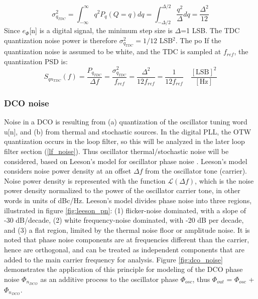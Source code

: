 	\begin{equation}\label{eq:tdc_noise}
		\sigma_{q_{TDC}}^2 = \int_{-\infty}^\infty q^2P_q(Q=q)dq =  \int_{-\Delta/2}^{\Delta/2}\frac{q^2}{\Delta}dq = \frac{\Delta^2}{12}
	\end{equation}
	Since $e_\Phi$[n] is a digital signal, the minimum step size is $\Delta$=1 LSB. The TDC quantization noise power is therefore $\sigma_{q_{TDC}}^2 = 1/12$ LSB$^2$. The po
	If the quantization noise is assumed to be white, and the TDC is sampled at $f_{ref}$, the quantization PSD is:
	\begin{equation}
		S_{qn_{TDC}}(f) = \frac{P_{q_{TDC}}}{\Delta f} = \frac{\sigma_{q_{TDC}}^2}{f_{ref}} = \frac{\Delta^2}{12f_{ref}} = \frac{1}{12f_{ref}} \hspace{1em}\frac{[\text{LSB}]^2}{[\text{Hz}]}
	\end{equation}

\subsubsection{DCO noise}\label{dco_noise}
	Noise in a DCO is resulting from (a) quantization of the oscillator tuning word u[n], and (b) from thermal and stochastic sources. In the digital PLL, the OTW quantization occurs in the loop filter, so this will be analyzed in the later loop filter section (\ref{lf_noise}). Thus oscillator thermal/stochastic noise will be considered, based on Leeson's model for oscillator phase noise \cite{leeson_1966}. Leeson's model considers noise power density at an offset $\Delta f$ from the oscillator tone (carrier). Noise power density is represented with the function $\mathcal{L}(\Delta f)$, which is the noise power density normalized to the power of the oscillator carrier tone, in other words in units of dBc/Hz. Leeson's model divides phase noise into three regions, illustrated in figure \ref{fig:leeson_pn}: (1) flicker-noise dominated, with a slope of -30 dB/decade, (2) white frequency-noise dominated, with -20 dB per decade, and (3) a flat region, limited by the thermal noise floor or amplitude noise. It is noted that phase noise components are at frequencies different than the carrier, hence are orthogonal, and can be treated as independent components that are added to the main carrier frequency for analysis. Figure \ref{fig:dco_noise} demonstrates the application of this principle for modeling of the DCO phase noise $\Phi_{n_{DCO}}$ as an additive process to the oscillator phase $\Phi_{osc}$, thus $\Phi_{out}$ = $\Phi_{osc}$ + $\Phi_{n_{DCO}}$.


